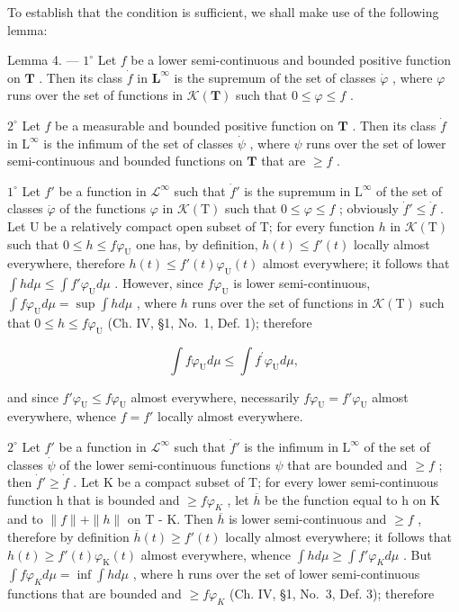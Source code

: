 To establish that the condition is sufficient, we shall make use of the following lemma:

Lemma 4. --- \(1^{\circ}\) Let \(f\) be a lower semi-continuous and bounded positive function on \(\mathbf{T}\) . Then its class \(\dot{f}\) in \(\mathbf{L}^{\infty}\) is the supremum of the set of classes \(\dot{\varphi}\) , where \(\varphi\) runs over the set of functions in \(\mathcal{K}(\mathbf{T})\) such that \(0 \leqslant \varphi \leqslant f\) .

\(2^{\circ}\) Let \(f\) be a measurable and bounded positive function on \(\mathbf{T}\) . Then its class \(\dot{f}\) in \(\mathrm{L}^{\infty}\) is the infimum of the set of classes \(\dot{\psi}\) , where \(\psi\) runs over the set of lower semi-continuous and bounded functions on \(\mathbf{T}\) that are \(\geqslant f\) .

\(1^{\circ}\) Let \(f'\) be a function in \(\mathcal{L}^{\infty}\) such that \(\dot{f}'\) is the supremum in \(\mathrm{L}^{\infty}\) of the set of classes \(\dot{\varphi}\) of the functions \(\varphi\) in \(\mathcal{K}(\mathrm{T})\) such that \(0 \leqslant \varphi \leqslant f\) ; obviously \(\dot{f}' \leqslant \dot{f}\) . Let U be a relatively compact open subset of T; for every function \(h\) in \(\mathcal{K}(\mathrm{T})\) such that \(0 \leqslant h \leqslant f\varphi_{\mathrm{U}}\) one has, by definition, \(h(t) \leqslant f'(t)\) locally almost everywhere, therefore \(h(t) \leqslant f'(t)\varphi_{\mathrm{U}}(t)\) almost everywhere; it follows that \(\int h d\mu \leqslant \int f'\varphi_{\mathrm{U}} d\mu\) . However, since \(f\varphi_{\mathrm{U}}\) is lower semi-continuous, \(\int f\varphi_{\mathrm{U}} d\mu = \sup \int h d\mu\) , where \(h\) runs over the set of functions in \(\mathcal{K}(\mathrm{T})\) such that \(0 \leqslant h \leqslant f\varphi_{\mathrm{U}}\) (Ch. IV, §1, No.~1, Def. 1); therefore

\[
\int f \varphi_ {\mathrm{U}} d \mu \leqslant \int f ^ {\prime} \varphi_ {\mathrm{U}} d \mu ,
\]

and since \(f' \varphi_{\mathrm{U}} \leqslant f \varphi_{\mathrm{U}}\) almost everywhere, necessarily \(f \varphi_{\mathrm{U}} = f' \varphi_{\mathrm{U}}\) almost everywhere, whence \(f = f'\) locally almost everywhere.

\(2^{\circ}\) Let \(f'\) be a function in \(\mathcal{L}^{\infty}\) such that \(\dot{f}'\) is the infimum in \(\mathrm{L}^{\infty}\) of the set of classes \(\dot{\psi}\) of the lower semi-continuous functions \(\psi\) that are bounded and \(\geqslant f\) ; then \(\dot{f}' \geqslant \dot{f}\) . Let K be a compact subset of T; for every lower semi-continuous function h that is bounded and \(\geqslant f\varphi_{K}\) , let \(\overline{h}\) be the function equal to h on K and to \(\|f\| + \|h\|\) on T - K. Then \(\overline{h}\) is lower semi-continuous and \(\geqslant f\) , therefore by definition \(\overline{h}(t) \geqslant f'(t)\) locally almost everywhere; it follows that \(h(t) \geqslant f'(t)\varphi_{\mathrm{K}}(t)\) almost everywhere, whence \(\int h d\mu \geqslant \int f'\varphi_{K} d\mu\) . But \(\int f\varphi_{K} d\mu = \inf \int h d\mu\) , where h runs over the set of lower semi-continuous functions that are bounded and \(\geqslant f\varphi_{K}\) (Ch. IV, §1, No.~3, Def. 3); therefore

